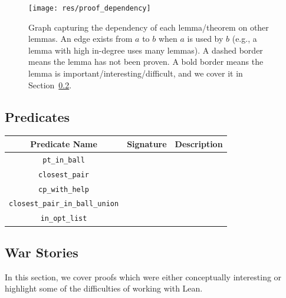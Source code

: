 \documentclass{article}
\begin{document}
\begin{figure}[H]
  \begin{center}
  \texttt{[image: res/proof\_dependency]}
  \end{center}
  \caption{
    Graph capturing the dependency of each lemma/theorem on other lemmas.
    An edge exists from $a$ to $b$ when $a$ is used by $b$ (e.g., a lemma with high in-degree uses many lemmas).
    A dashed border means the lemma has not been proven.
    A bold border means the lemma is important/interesting/difficult, and we cover it in Section~\ref{sec:war_stories}.
  }
\end{figure}


\subsection{Predicates}
\begin{center}
\begin{tabular} {|| c | c | c ||}
  \hline
  Predicate Name & Signature & Description \\
  \hline
  \hline
  \texttt{pt\_in\_ball} & & \\
  \hline
  \texttt{closest\_pair} & & \\
  \hline
  \texttt{cp\_with\_help} & & \\
  \hline
  \texttt{closest\_pair\_in\_ball\_union} & & \\
  \hline
  \texttt{in\_opt\_list} & & \\
  \hline
\end{tabular}
\end{center}


\subsection{War Stories}\label{sec:war_stories}
In this section, we cover proofs which were either conceptually interesting or highlight some of the difficulties of working with Lean.
\end{document}

